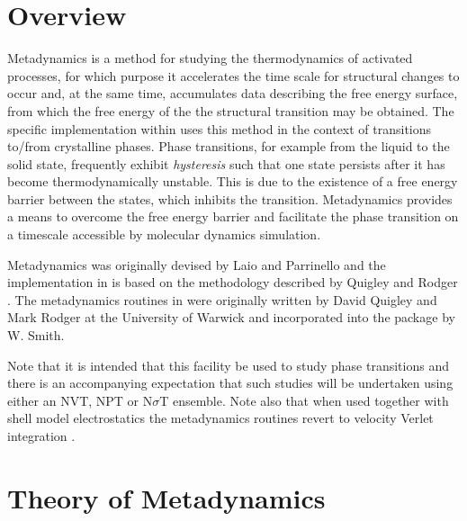 \section{Overview}

Metadynamics \cite{laio-02a,quigley-09a} is a method for studying the
thermodynamics of activated processes, for which purpose it accelerates the
time scale for structural changes to occur and, at the same time, accumulates
data describing the free energy surface, from which the free energy of the the
structural transition may be obtained. The specific implementation within \D{}
uses this method in the context of transitions to/from crystalline phases.
Phase transitions, for example from the liquid to the solid state, frequently
exhibit {\em hysteresis} such that one state persists after it has become
thermodynamically unstable. This is due to the existence of a free energy
barrier between the states, which inhibits the transition. Metadynamics
provides a means to overcome the free energy barrier and facilitate the phase
transition on a timescale accessible by molecular dynamics simulation.

Metadynamics was originally devised by Laio and Parrinello
\cite{laio-02a} and the implementation in \D{} is based on the methodology
described by Quigley and Rodger \cite{quigley-09a}.
The metadynamics routines in \D{} were originally written by David Quigley and
Mark Rodger at the University of Warwick and incorporated into the package by
W. Smith.  

Note that it is intended that this facility be used to study phase transitions
and there is an accompanying expectation that such studies will be undertaken
using either an NVT, NPT or N$\sigma$T ensemble. Note also that when used
together with shell model electrostatics the metadynamics routines revert
to velocity Verlet integration .

\section{Theory of Metadynamics}
\label{metadtheory}

